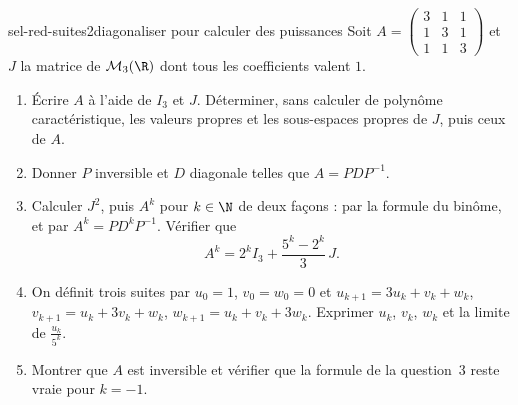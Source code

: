 \begin{exo}{sel-red-suites}{2}{diagonaliser pour calculer des puissances}
Soit $A=\begin{pmatrix}3&1&1\\1&3&1\\1&1&3\end{pmatrix}$ et $J$ la matrice de $\mathcal M_3(\R)$ dont tous les coefficients valent $1$.
\begin{enumerate}
\item Écrire $A$ à l'aide de $I_3$ et $J$. Déterminer, sans calculer de polynôme caractéristique, les valeurs propres et les sous-espaces
propres de $J$, puis ceux de $A$.
\item Donner $P$ inversible et $D$ diagonale telles que $A=PDP^{-1}$.
\item Calculer $J^2$, puis $A^k$ pour $k\in\N$ de deux façons : par la formule du binôme, et par $A^k=PD^kP^{-1}$. Vérifier que
\[A^k=2^kI_3+\frac{5^k-2^k}3\,J.\]
\item On définit trois suites par $u_0=1$, $v_0=w_0=0$ et
$u_{k+1}=3u_k+v_k+w_k$, $v_{k+1}=u_k+3v_k+w_k$, $w_{k+1}=u_k+v_k+3w_k$. Exprimer $u_k$, $v_k$, $w_k$ et la limite de $\frac{u_k}{5^k}$.
\item Montrer que $A$ est inversible et vérifier que la formule de la question~3 reste vraie pour $k=-1$.
\end{enumerate}
\end{exo}

